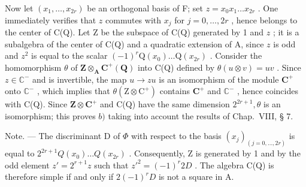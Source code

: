 Now let \((x_{1},\ldots ,x_{2r})\) be an orthogonal basis of F; set \(z = x_0x_1\dots x_{2r}\) . One immediately verifies that \(z\) commutes with \(x_{j}\) for \(j = 0,\dots,2r\) , hence belongs to the center of C(Q). Let Z be the subspace of C(Q) generated by 1 and \(z\) ; it is a subalgebra of the center of C(Q) and a quadratic extension of A, since \(z\) is odd and \(z^2\) is equal to the scalar \((-1)^r\mathrm{Q}(x_0)\ldots \mathrm{Q}(x_{2r})\) . Consider the homomorphism \(\theta\) of \(\mathbf{Z}\otimes_{\mathbf{A}}\mathbf{C}^{+}(\mathbf{Q})\) into C(Q) defined by \(\theta (u\otimes v) = uv\) . Since \(z\in \mathbb{C}^{-}\) and is invertible, the map \(u\to zu\) is an isomorphism of the module \(\mathbf{C}^+\) onto \(\mathbb{C}^{-}\) , which implies that \(\theta (\mathrm{Z}\otimes \mathrm{C}^{+})\) contains \(\mathbf{C}^{+}\) and \(\mathbb{C}^{-}\) , hence coincides with C(Q). Since \(\mathbf{Z}\otimes \mathbf{C}^{+}\) and C(Q) have the same dimension \(2^{2r + 1},\theta\) is an isomorphism; this proves \(b)\) taking into account the results of Chap.~VIII, § 7.

Note. --- The discriminant D of \(\Phi\) with respect to the basis \((x_{j})_{(j=0,\ldots,2r)}\) is equal to \(2^{2r+1}Q(x_{0})\ldots Q(x_{2r})\) . Consequently, Z is generated by 1 and by the odd element \(z' = 2^{r+1}z\) such that \(z'^{2} = (-1)^{r}2D\) . The algebra C(Q) is therefore simple if and only if \(2(-1)^{r}D\) is not a square in A.
